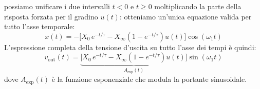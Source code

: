 \documentclass[11pt,a4paper]{article}
\begin{document}
possiamo unificare i due intervalli $t < 0$ e $t \ge 0$ moltiplicando la parte della risposta forzata per il gradino $u(t)$: otteniamo un'unica equazione valida per tutto l'asse temporale:
\begin{equation}
    \label{eq:sol_unificata_x}
    x(t) = -\Big[ X_0 \, e^{-t/\tau} - X_\infty \left(1 - e^{-t/\tau}\right) u(t) \Big] \cos(\omega_1 t)
\end{equation}
L'espressione completa della tensione d'uscita su tutto l'asse dei tempi è quindi:
\begin{equation}
    \label{eq:vout_unificata_completa}
    v_{\text{out}}(t) = \underbrace{\Big[ X_0 \, e^{-t/\tau} - X_\infty \left(1 - e^{-t/\tau}\right) u(t) \Big]}_{A_{\text{exp}}(t)} \sin(\omega_1 t)
\end{equation}
dove $A_{\text{exp}}(t)$ è la funzione esponenziale che modula la portante sinusoidale.
\newpage
\end{document}
